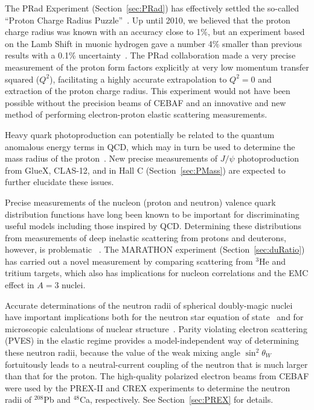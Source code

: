 The PRad Experiment (Section~\ref{sec:PRad}) has effectively settled the so-called ``Proton Charge Radius Puzzle''~\cite{CARLSON201559,gao2021proton}. Up until 2010, we believed that the proton charge radius was known with an accuracy close to 1\%, but an experiment based on the Lamb Shift in muonic hydrogen gave a number 4\% smaller than previous results  with a 0.1\% uncertainty~\cite{Pohl10,Anti13}. The PRad collaboration made a very precise measurement of the proton form factors explicitly at very low momentum transfer squared ($Q^2$), facilitating a highly accurate extrapolation to $Q^2=0$ and extraction of the proton charge radius. This experiment would not have been possible without the precision beams of CEBAF %
and an innovative and new method of performing electron-proton elastic scattering measurements.


Heavy quark photoproduction can potentially be related to the quantum 
anomalous energy terms in QCD, which may in turn be used to determine 
the mass radius of the proton~\cite{Kharzeev:2021qkd}.  New precise measurements of $J/\psi$ 
photoproduction from GlueX, CLAS-12, and in Hall C (Section~\ref{sec:PMass}) are expected to 
further elucidate these issues. 

Precise measurements of the nucleon (proton and neutron) valence quark distribution functions have long been known to be important for discriminating useful models including those inspired by QCD. Determining these distributions from measurements of deep inelastic scattering from protons and deuterons, however, is problematic~\cite{Melnitchouk:1995fc, Accardi:2016qay} . The MARATHON experiment (Section~\ref{sec:duRatio}) has carried out a novel measurement by comparing scattering from $^3$He and tritium targets, which also has implications for nucleon correlations and the EMC effect in $A=3$ nuclei.

Accurate determinations of the neutron radii of spherical doubly-magic nuclei have important implications both for the neutron star equation of state~\cite{Horowitz:2001ya} and for microscopic calculations of nuclear structure~\cite{Hagen:2015yea}. Parity violating electron scattering (PVES) in the elastic regime provides a model-independent way of determining these neutron radii, because the value of the weak mixing angle $\sin^2\theta_W$ fortuitously leads to a neutral-current coupling of the neutron that is much larger than that for the proton. The high-quality polarized electron beams from CEBAF were used by the PREX-II and CREX experiments to determine the neutron radii of $^{208}$Pb and $^{48}$Ca, respectively. See Section~\ref{sec:PREX} for details.

